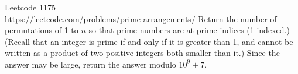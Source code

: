   Leetcode 1175 \\
  \url{https://leetcode.com/problems/prime-arrangements/}
  Return the number of permutations of 1 to $n$ so that prime numbers are at
  prime indices (1-indexed.)
  (Recall that an integer is prime if and only if it is greater than 1,
  and cannot be written as a product of two positive integers both smaller
  than it.)
  Since the answer may be large, return the answer modulo $10^9 + 7$.
